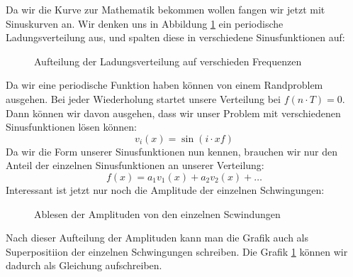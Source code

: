 Da wir die Kurve zur Mathematik bekommen wollen fangen wir jetzt mit Sinuskurven an. Wir denken uns in Abbildung \ref{fig:frequenzaufteilung} ein periodische Ladungsverteilung aus, und spalten diese in verschiedene Sinusfunktionen auf:
\begin{figure}[H]
	\caption{Aufteilung der Ladungsverteilung auf verschieden Frequenzen}\label{fig:frequenzaufteilung}
\end{figure}
Da wir eine periodische Funktion haben können von einem Randproblem ausgehen. Bei jeder Wiederholung startet unsere Verteilung bei $f(n\cdot T) = 0$. Dann können wir davon ausgehen, dass wir unser Problem mit verschiedenen Sinusfunktionen lösen können:
\begin{equation}
	v_i(x) = \sin (i\cdot x f) 
\end{equation}
Da wir die Form unserer Sinusfunktionen nun kennen, brauchen wir nur den Anteil der einzelnen Sinusfunktionen an unserer Verteilung:
\begin{equation}
	f(x) = a_1 v_1(x) + a_2 v_2(x) + \dots
\end{equation}
Interessant ist jetzt nur noch die Amplitude der einzelnen Schwingungen:
\begin{figure}[H]
	\caption{Ablesen der Amplituden von den einzelnen Scwindungen}
\end{figure}
Nach dieser Aufteilung der Amplituden kann man die Grafik auch als Superpositiion der einzelnen Schwingungen schreiben. Die Grafik \ref{fig:frequenzaufteilung} können wir dadurch als Gleichung aufschreiben.


